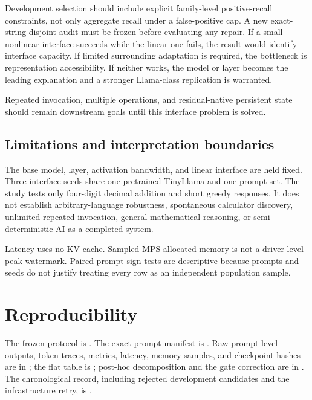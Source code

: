 \documentclass[11pt]{article}
\begin{document}
Development selection should include explicit family-level positive-recall
constraints, not only aggregate recall under a false-positive cap. A new
exact-string-disjoint audit must be frozen before evaluating any repair. If a
small nonlinear interface succeeds while the linear one fails, the result
would identify interface capacity. If limited surrounding adaptation is
required, the bottleneck is representation accessibility. If neither works,
the model or layer becomes the leading explanation and a stronger
Llama-class replication is warranted.

Repeated invocation, multiple operations, and residual-native persistent state
should remain downstream goals until this interface problem is solved.

\subsection{Limitations and interpretation boundaries}

The base model, layer, activation bandwidth, and linear interface are held
fixed. Three interface seeds share one pretrained TinyLlama and one prompt
set. The study tests only four-digit decimal addition and short greedy
responses. It does not establish arbitrary-language robustness, spontaneous
calculator discovery, unlimited repeated invocation, general mathematical
reasoning, or semi-deterministic AI as a completed system.

Latency uses no KV cache. Sampled MPS allocated memory is not a driver-level
peak watermark. Paired prompt sign tests are descriptive because prompts and
seeds do not justify treating every row as an independent population sample.

\section{Reproducibility}

The frozen protocol is
. The exact prompt manifest is
. Raw prompt-level outputs,
token traces, metrics, latency, memory samples, and checkpoint hashes are in
; the flat table is
; post-hoc decomposition and the
gate correction are in . The chronological
record, including rejected development candidates and the infrastructure
retry, is .
\end{document}
